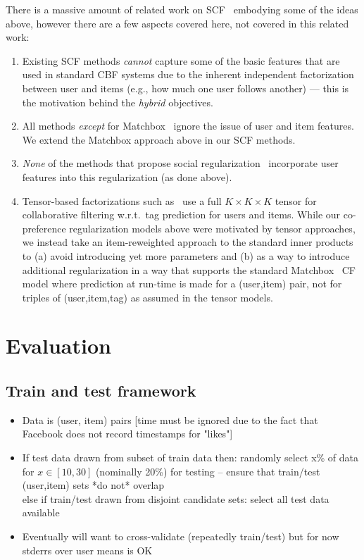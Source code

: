 \documentclass[11pt,a4paper]{article}
\begin{document}
There is a massive amount of related work on 
SCF~\cite{matchbox,ste,lla,glfm,tf,sorec,sr,rrmf,bisim,socinf} embodying some of the
ideas above, however there are a few aspects covered here, not covered
in this related work:
\begin{enumerate}
\item Existing SCF methods \emph{cannot} capture some of the basic features that are used in standard CBF systems due to the inherent independent factorization between user and items (e.g., how much one user follows another) --- this is the motivation behind the \emph{hybrid} objectives.
\item All methods \emph{except} for Matchbox~\cite{matchbox} ignore the issue of user and item features.  We extend the Matchbox approach above in our SCF methods. 
\item \emph{None} of the methods that propose social regularization~\cite{ste,sr,rrmf,lla,glfm,socinf} incorporate user features into this regularization (as done above).
\item Tensor-based factorizations such as~\cite{tf} use a full $K \times K \times K$ tensor for collaborative filtering w.r.t.\ tag prediction for users and items.  While our co-preference regularization models above were motivated by tensor approaches, we instead take an item-reweighted approach to the standard inner products to (a) avoid introducing yet more parameters and (b) as a way to introduce additional regularization in a way that supports the standard Matchbox~\cite{matchbox} CF model where prediction at run-time is made for a (user,item) pair, not for triples of (user,item,tag) as assumed in the tensor models.
\end{enumerate}

\section{Evaluation}

\subsection{Train and test framework}

\begin{itemize}
\item Data is (user, item) pairs [time must be ignored due to the fact that Facebook does not record timestamps for "likes"]
\item If test data drawn from subset of train data 
then: randomly select x\% of data for $x \in [10,30]$ (nominally 20\%) for testing -- ensure that train/test (user,item) sets *do not* overlap\\
else if train/test drawn from disjoint candidate sets: select all test data available\item Eventually will want to cross-validate (repeatedly train/test) but for now stderrs over user means is OK
\end{itemize}
\end{document}
